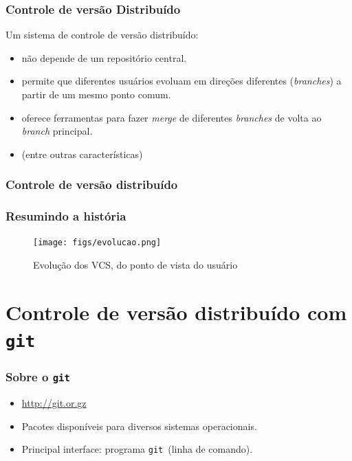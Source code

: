 \documentclass{beamer}
\newcommand{\git}{\texttt{git}}
\begin{document}
\begin{frame}
  \frametitle{Controle de versão Distribuído}

  Um sistema de controle de versão distribuído:

  \begin{itemize}
      \pause
    \item não depende de um repositório central.
      \pause
    \item permite que diferentes usuários evoluam em direções diferentes
      (\emph{branches}) a partir de um mesmo ponto comum.
      \pause
    \item oferece ferramentas para fazer \emph{merge} de diferentes
      \emph{branches} de volta ao \emph{branch} principal.
      \pause
    \item (entre outras características)
  \end{itemize}
\end{frame}

\begin{frame}
  \frametitle{Controle de versão distribuído}
  \begin{figure}[h]
    \begin{center}
    \end{center}
    \label{fig:distributed-vcs}
  \end{figure}
\end{frame}

\begin{frame}
  \frametitle{Resumindo a história}
  \begin{figure}[h]
    \begin{center}
      \texttt{[image: figs/evolucao.png]}
    \end{center}
    \caption{Evolução dos VCS, do ponto de vista do usuário}
    \label{fig:evolucao}
  \end{figure}
\end{frame}

\section[\git]{Controle de versão distribuído com \git}

\begin{frame}
  \frametitle{Sobre o \git}
  \begin{itemize}
    \item \url{http://git.or.gz}
    \item Pacotes disponíveis para diversos sistemas operacionais.
    \item Principal interface: programa \git\ (linha de comando).
  \end{itemize}
\end{frame}
\end{document}
